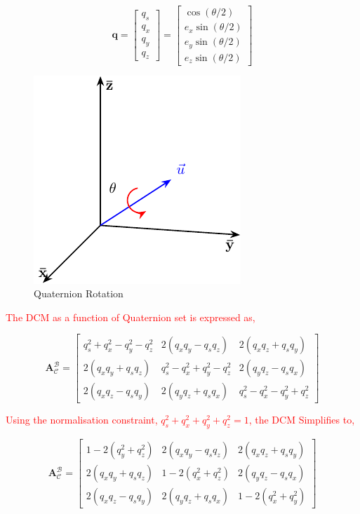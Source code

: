 \begin{equation}
    \mathbf{q} = \begin{bmatrix} q_s \\ q_x \\ q_y \\ q_z \end{bmatrix}
    = \begin{bmatrix} \cos(\theta/2) \\ e_x\sin(\theta/2) \\ e_y\sin(\theta/2) \\ e_z\sin(\theta/2) \end{bmatrix}
\end{equation}

\begin{figure}[H]
    \centering
    \includegraphics[width=0.3\linewidth]{figures/Quaternion.pdf}
    \caption{Quaternion Rotation}
    \label{fig:3.2}
\end{figure}

\textcolor{red}{The DCM as a function of Quaternion set is expressed as,}

\begin{equation}
    \mathbf{A}_{\mathcal{C}}^{\mathcal{B}} = 
    \begin{bmatrix}
    q_s^2 + q_x^2 - q_y^2 - q_z^2 & 2(q_x q_y - q_s q_z) & 2(q_x q_z + q_s q_y) \\
    2(q_x q_y + q_s q_z) & q_s^2 - q_x^2 + q_y^2 - q_z^2 & 2(q_y q_z - q_s q_x) \\
    2(q_x q_z - q_s q_y) & 2(q_y q_z + q_s q_x) & q_s^2 - q_x^2 - q_y^2 + q_z^2   
    \end{bmatrix}
\end{equation}

\textcolor{red}{Using the normalisation constraint, $q_s^2 + q_x^2 + q_y^2 + q_z^2 = 1$, the DCM Simplifies to,}

\begin{equation}
    \mathbf{A}_{\mathcal{C}}^{\mathcal{B}} = 
    \begin{bmatrix}
    1 - 2(q_y^2 + q_z^2) & 2(q_x q_y - q_s q_z) & 2(q_x q_z + q_s q_y) \\
    2(q_x q_y + q_s q_z) & 1 - 2(q_x^2 + q_z^2) & 2(q_y q_z - q_s q_x) \\
    2(q_x q_z - q_s q_y) & 2(q_y q_z + q_s q_x) & 1 - 2(q_x^2 + q_y^2)   
    \end{bmatrix}
\end{equation}


